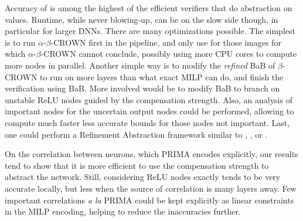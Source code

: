 Accuracy of {\toolname} is among the highest of the efficient verifiers that do abstraction on values. Runtime, while never blowing-up, can be on the slow side though, in particular for larger DNNs. There are many optimizations possible. The simplest is to run $\alpha$-$\beta$-CROWN first in the pipeline, and only use {\toolname} for those images for which $\alpha$-$\beta$-CROWN cannot conclude, possibly using more CPU cores to compute more nodes in parallel. Another simple way is to modify the {\em refined} BaB of $\beta$-CROWN to run {\toolname} on more layers than what exact MILP can do, and finish the verification using BaB. More involved would be to modify BaB to branch on unstable ReLU nodes guided by the compensation strength. Also, an analysis of important nodes for the uncertain output nodes could be performed, allowing to compute much faster less accurate bounds for those nodes not important. Last, one could perform a Refinement Abstraction framework similar to \cite{atva}, \cite{elboher}, or \cite{SRGR}.

On the correlation between neurons, which PRIMA encodes explicitly, our results tend to show that it is more efficient to use the compensation strength to abstract the network. Still, considering ReLU nodes exactly tends to be very accurate locally, but less when the source of correlation is many layers away. Few important correlations {\em a la} PRIMA could be kept explicitly as linear constraints in the MILP encoding, helping to reduce the inaccuracies further.

